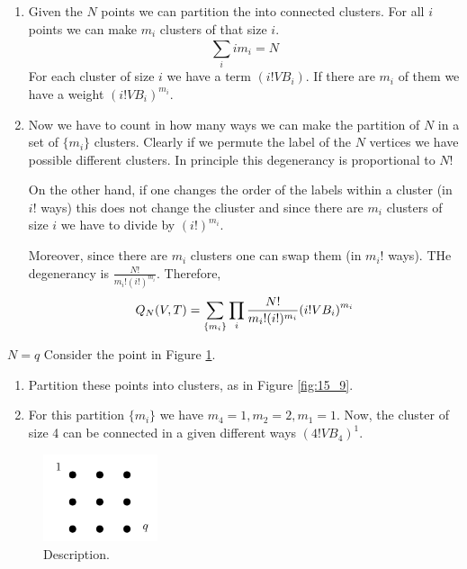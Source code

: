 \documentclass[../main/main.tex]{subfiles}
\begin{document}
\begin{enumerate}
\item Given the \( N \) points we can partition the into connected clusters. For all \( i \) points we can make \( m_i \) clusters of that size \( i \).
\begin{equation}
  \sum_{i}^{} i m_i = N
\end{equation}
For each cluster of size \( i \) we have a term \( (i!VB_i) \). If there are \( m_i \) of them we have a weight \( (i! V B_i)^{m_i} \).
\item Now we have to count in how many ways we can make the partition of \( N \) in a set of \( \{ m_i \}   \) clusters. Clearly if we permute the label of the \( N \) vertices we have possible different clusters. In principle this degenerancy is proportional to \( N \)!

On the other hand, if one changes the order of the labels within a cluster (in \( i! \) ways) this does not change the cliuster and since there are \( m_i \) clusters of size \( i \) we have to divide by \( (i!)^{m_i} \).

Moreover, since there are \( m_i \) clusters one can swap them (in \( m_i! \) ways). THe degenerancy is \( \frac{N!}{m_i! (i!)^{m_i}} \). Therefore,
\begin{equation}
  Q_N (V,T) = \sum_{\{ m_i \}  }^{} \prod_{i}^{}    \frac{N!}{m_i! (i!)^{m_i}} \qty(i! V B_i)^{m_i}
\end{equation}
\end{enumerate}
\begin{example}{\( N=q \)}{}
Consider the point in Figure \ref{fig:15_8}.
  \begin{enumerate}
  \item Partition these points into clusters, as in Figure \ref{fig:15_9}.
  \item For this partition \( \{ m_i \}   \) we have \( m_4=1,m_2=2,m_1=1 \). Now, the cluster of size 4 can be connected in a given different ways \( (4! V B_4)^1 \).
  \end{enumerate}
\end{example}

\begin{figure}[h!]
\centering
\includegraphics[width=0.3\textwidth]{../lessons/15_image/11.pdf}
\caption{\label{fig:15_8} Description.}
\end{figure}
\end{document}
